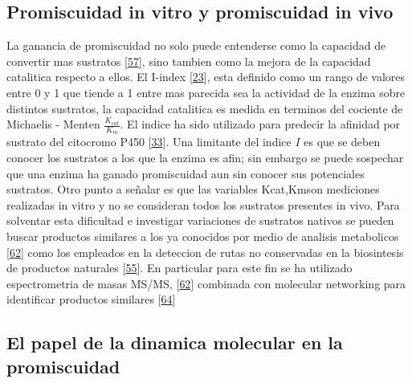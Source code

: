\documentclass[12pt,twoside]{reedthesis}
\begin{document}
  \subsection{Promiscuidad in vitro y promiscuidad in
  vivo}\label{promiscuidad-in-vitro-y-promiscuidad-in-vivo}
  
  La ganancia de promiscuidad no solo puede entenderse como la capacidad
  de convertir mas sustratos
  {[}\protect\hyperlink{ref-carbonell_molecular_2010}{57}{]}, sino tambien
  como la mejora de la capacidad catalitica respecto a ellos. El I-index
  {[}\protect\hyperlink{ref-nath_quantitative_2008}{23}{]}, esta definido
  como un rango de valores entre 0 y 1 que tiende a 1 entre mas parecida
  sea la actividad de la enzima sobre distintos sustratos, la capacidad
  catalitica es medida en terminos del cociente de Michaelis - Menten
  \(\frac{K_{cat}}{K_m}\). El indice ha sido utilizado para predecir la
  afinidad por sustrato del citocromo P450
  {[}\protect\hyperlink{ref-nath_quantifying_2010}{33}{]}. Una limitante
  del indice \(I\) es que se deben conocer los sustratos a los que la
  enzima es afin; sin embargo se puede sospechar que una enzima ha ganado
  promiscuidad aun sin conocer sus potenciales sustratos. Otro punto a
  señalar es que las variables Kcat,Kmson mediciones realizadas in vitro y
  no se consideran todos los sustratos presentes in vivo. Para solventar
  esta dificultad e investigar variaciones de sustratos nativos se pueden
  buscar productos similares a los ya conocidos por medio de analisis
  metabolicos {[}\protect\hyperlink{ref-nesvizhskii_analysis_2007}{62}{]}
  como los empleados en la deteccion de rutas no conservadas en la
  biosintesis de productos naturales
  {[}\protect\hyperlink{ref-medema_computational_2015}{55}{]}. En
  particular para este fin se ha utilizado espectrometria de masas MS/MS,
  {[}\protect\hyperlink{ref-nesvizhskii_analysis_2007}{62}{]} combinada
  con molecular networking para identificar productos similares
  {[}\protect\hyperlink{ref-yang_molecular_2013}{64}{]}
  
  \subsection{El papel de la dinamica molecular en la
  promiscuidad}\label{el-papel-de-la-dinamica-molecular-en-la-promiscuidad}
  
\end{document}
